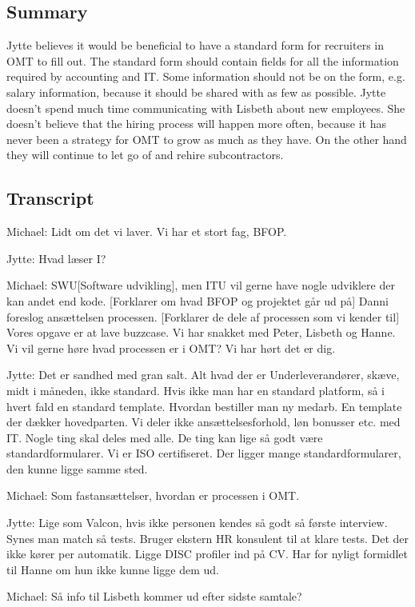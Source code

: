 \subsection{Summary}
Jytte believes it would be beneficial to have a standard form for recruiters in OMT to fill out.
The standard form should contain fields for all the information required by accounting and IT.
Some information should not be on the form, e.g. salary information, because it should be shared with as few as possible.
Jytte doesn't spend much time communicating with Lisbeth about new employees.
She doesn't believe that the hiring process will happen more often, because it has never been a strategy for OMT to grow as much as they have.
On the other hand they will continue to let go of and rehire subcontractors.
\subsection{Transcript}
Michael:
Lidt om det vi laver. Vi har et stort fag, BFOP.

Jytte:
Hvad læser I?

Michael:
SWU[Software udvikling], men ITU vil gerne have nogle udviklere
der kan andet end kode.
[Forklarer om hvad BFOP og projektet går ud på]
Danni foreslog ansættelsen processen. 
[Forklarer de dele af processen som vi kender til]
Vores opgave er at lave buzzcase. Vi har snakket med Peter,
Lisbeth og Hanne. Vi vil gerne høre hvad processen er i OMT?
Vi har hørt det er dig.

Jytte:
Det er sandhed med gran salt. Alt hvad der er
Underleverandører, skæve, midt i måneden, ikke standard.
Hvis ikke man har en standard platform, så i hvert fald
en standard template. 
Hvordan bestiller man ny medarb. En template der dækker hovedparten.
Vi deler ikke ansættelsesforhold, løn bonusser etc. med IT.
Nogle ting skal deles med alle. De ting kan lige så godt være
standardformularer.
Vi er ISO certifiseret. Der ligger mange standardformularer,
den kunne ligge samme sted.

Michael:
Som fastansættelser, hvordan er processen i OMT.

Jytte:
Lige som Valcon, hvis ikke personen kendes så godt så første interview. 
Synes man match så tests. Bruger ekstern HR konsulent til at klare tests.
Det der ikke kører per automatik. Ligge DISC profiler ind på CV. 
Har for nyligt formidlet til Hanne om hun ikke kunne ligge dem ud.

Michael:
Så info til Lisbeth kommer ud efter sidste samtale?

